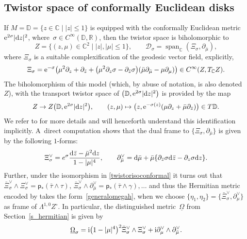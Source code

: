 \documentclass[pdftex]{sigma}
\numberwithin{equation}{section}
\theoremstyle{definition}
\newcommand{\R}{\mathbb{R}} %
\newcommand{\C}{\mathbb{C}} %
\newcommand{\DD}{\mathbb{D}} %
\newcommand{\1}{{\bf 1}}
\newcommand{\Om}{{\underline{\Omega}}}
\newcommand{\D}{\mathscr{D}}
\DeclareMathOperator{\spn}{span}
\begin{document}
\subsection{Twistor space of conformally Euclidean disks}\label{s_conformallyeuclidean}
If $M=\DD=\{z\in \C\mid |z|\le 1\}$ is equipped with the conformally Euclidean metric ${\rm e}^{2\sigma}|{\rm d}z|^2$, where~${\sigma\in C^\infty(\DD,\R)}$, then the twistor space is biholomorphic to
\[
	Z=\big\{(z,\mu)\in \C^2\mid |z|,|\mu|\le 1\big\},\qquad \D_\sigma = \spn_\C(\Xi_\sigma,\partial_{\bar \mu}),
\]
where $\Xi_\sigma$ is a suitable complexification of the geodesic vector field, explicitly,
\begin{equation}
	\Xi_\sigma={\rm e}^{-\sigma} \bigl(\mu^2\partial_z+\partial_{\bar z} + \bigl(\mu^2 \partial_z\sigma - \partial_{\bar z}\sigma\bigr)(\bar \mu \partial_{\bar \mu} - \mu \partial_\mu) \bigr) \in C^\infty(Z,T_\C Z).
	\label{Xisig}
\end{equation}
The biholomorphism of this model (which, by abuse of notation, is also denoted $Z$), with the transport twistor space of $\bigl(\DD,{\rm e}^{2\sigma} |{\rm d}z|^2\bigr)$ is provided by the map
\begin{equation}\label{twistorisoconformal}
	Z\rightarrow Z\bigl(\DD,{\rm e}^{2\sigma}|{\rm d}z|^2\bigr),\qquad (z,\mu)\mapsto \bigl(z,{\rm e}^{-\sigma(z)}(\mu\partial_z+\bar \mu \partial_{\bar z})\bigr)\in T\DD.
\end{equation}
We refer to \cite[Section~4.2]{BoPa23} for more details and will henceforth understand this identification implicitly. A~direct computation shows that the dual frame to $\{\Xi_\sigma,\partial_{\bar \mu}\}$ is given by the following $1$-forms:
\[%
	\Xi_\sigma^\vee = e^\sigma \frac{{\rm d}\bar z- \bar \mu^2 {\rm d}z}{1-|\mu|^4},\qquad \partial_{\bar\mu}^\vee = {\rm d}\bar \mu + \bar \mu\{\partial_{\bar z} \sigma {\rm d}\bar z - \partial_z \sigma {\rm d}z\}.
\]
Further, under the isomorphism in \eqref{twistorisoconformal} it turns out that $\bar \Xi_\sigma^\vee \wedge \Xi_\sigma^\vee = \mathsf{p}_*(\bar \tau\wedge \tau)$, $\bar \Xi_\sigma^\vee \wedge \partial_{\bar \mu}^\vee = \mathsf{p}_*(\bar \tau\wedge \gamma),\dots$ and thus the Hermitian metric encoded by  takes the form~\eqref{generalomegah}, when we choose $\{\eta_1,\eta_2\}=\{\bar {\Xi}^\vee_\sigma,\partial_\mu^\vee\}$ as frame of $\Lambda^{1,0}Z^\circ$. In particular, the distinguished metric~$\Om$ from Section~\ref{s_hermitian} is given by
\begin{equation}\label{def_omegasigma}
\Om_\sigma ={\rm i} \bigl(1-|\mu|^4\bigr)^2 \bar \Xi_\sigma^\vee \wedge \Xi_\sigma^\vee + {\rm i} \partial_\mu^\vee\wedge \partial_{\bar \mu}^\vee.
\end{equation}
\end{document}
